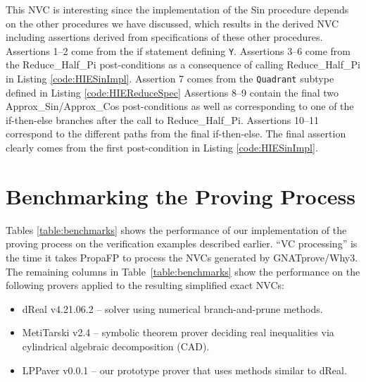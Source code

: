 \documentclass[runningheads]{llncs}
\begin{document}
This NVC is interesting since the implementation of the Sin procedure depends on the other procedures we have discussed, which results in the derived NVC including assertions derived from specifications of these other procedures.
Assertions 1--2 come from the if statement defining \lstinline{Y}.
Assertions 3--6 come from the Reduce\_Half\_Pi post-conditions as a consequence of calling Reduce\_Half\_Pi in Listing \ref{code:HIESinImpl}.
Assertion 7 comes from the \lstinline{Quadrant} subtype defined in Listing \ref{code:HIEReduceSpec}
Assertions 8--9 contain the final two Approx\_Sin/Approx\_Cos post-conditions as well as corresponding to one of the if-then-else branches after the call to Reduce\_Half\_Pi.
Assertions 10--11 correspond to the different paths from the final if-then-else. 
The final assertion clearly comes from the first post-condition in Listing \ref{code:HIESinImpl}.

\section{Benchmarking the Proving Process}\label{sec:benchmarks}

Tables \ref{table:benchmarks} shows
the performance of our implementation of the proving process on the verification examples described earlier.
``VC processing'' is the time it takes PropaFP to process the NVCs generated by GNATprove/Why3. 
The remaining columns in Table~\ref{table:benchmarks} show the performance on the following provers applied to the resulting simplified exact NVCs:
\begin{itemize}
  \item dReal v4.21.06.2 \cite{gao_dreal_2013} -- solver using numerical branch-and-prune methods.
  \item MetiTarski v2.4 \cite{akbarpour_metitarski_2010} -- symbolic theorem prover deciding real inequalities via cylindrical algebraic decomposition (CAD).
  \item LPPaver v0.0.1 \cite{noauthor_rasheedjalppaver_nodate} -- our prototype prover that uses methods similar to dReal.
\end{itemize}
\end{document}

